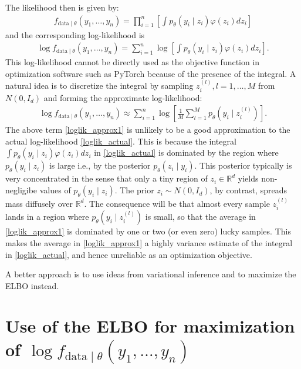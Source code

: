 \documentclass{scrartcl}
\newcommand{\R}{{\mathbb R}}
\begin{document}
The likelihood then is given by: 
\begin{align*}
 f_{\text{data} \mid \theta}(y_1, \dots, y_n) = \prod_{i=1}^n \left[
  \int p_{\theta}(y_i \mid z_i) \varphi(z_i) dz_i \right] 
\end{align*}
and the corresponding log-likelihood is
\begin{align}\label{loglik_actual}
 \log f_{\text{data} \mid \theta}(y_1, \dots, y_n) = \sum_{i=1}^n \log \left[ \int p_{\theta}(y_i \mid z_i) \varphi(z_i)
  dz_i \right].  
\end{align}
This log-likelihood cannot be directly used as the objective function
in optimization software such as PyTorch because of the presence of
the integral. A natural idea is to discretize the integral by sampling
$z^{(l)}_i, l = 1, \dots, M$  from $N(0, I_d)$ and forming the
approximate log-likelihood:
\begin{align}\label{loglik_approx1}
 \log f_{\text{data} \mid \theta}(y_1, \dots, y_n) \approx
  \sum_{i=1}^n \log \left[ \frac{1}{M} \sum_{l = 1}^M  
  p_{\theta}(y_i \mid z_i^{(l)}) \right]. 
\end{align}
The above term \eqref{loglik_approx1} is unlikely to be a good
approximation to the actual log-likelihood \eqref{loglik_actual}. This
 is because the integral $\int p_{\theta}(y_i \mid z_i) \varphi(z_i) dz_i$
in \eqref{loglik_actual} is dominated by the region where
$p_{\theta}(y_i \mid z_i)$ is large i.e., by the posterior
$p_{\theta}(z_i \mid y_i)$. This posterior typically is very
concentrated in the sense that only a tiny region of $z_i \in \R^d$
yields non-negligibe values of $p_{\theta}(y_i \mid
z_i)$. The prior $z_i \sim N(0, I_d)$, by contrast, spreads mass
diffusely over $\R^d$. The consequence will be that almost every
sample $z_i^{(l)}$ lands in a region where $p_{\theta}(y_i \mid
z_i^{(l)})$ is small, so that the average in \eqref{loglik_approx1} is
dominated by one or two (or even zero) lucky samples. This makes the
average in \eqref{loglik_approx1} a highly variance estimate of the
integral in \eqref{loglik_actual}, and hence unreliable as an
optimization objective.

A better approach is to use ideas from variational inference and to
maximize the ELBO instead.

\section{Use of the ELBO for maximization of $\log f_{\text{data} \mid
    \theta}(y_1, \dots, y_n)$ } 
\end{document}
